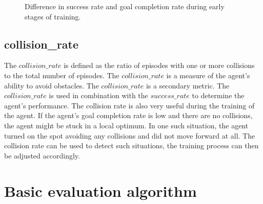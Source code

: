\begin{figure}
    \centering
    \caption{Difference in success rate and goal completion rate during early stages of training.}
    \label{fig:success_rate_vs_goal_completion_rate}
\end{figure}

\subsection{collision\_rate}

The $collision\_rate$ is defined as the ratio of episodes with one or more collisions to the total number of episodes. The $collision\_rate$ is a measure of the agent's ability to avoid obstacles. The $collision\_rate$ is a secondary metric. The $collision\_rate$ is used in combination with the $success\_rate$ to determine the agent's performance.
The collision rate is also very useful during the training of the agent. If the agent's goal completion rate is low and there are no collisions, the agent might be stuck in a local optimum. In one such situation, the agent turned on the spot avoiding any collisions and did not move forward at all.
The collision rate can be used to detect such situations, the training process can then be adjusted accordingly.


\section{Basic evaluation algorithm}
\label{sec:eval_model_track}

